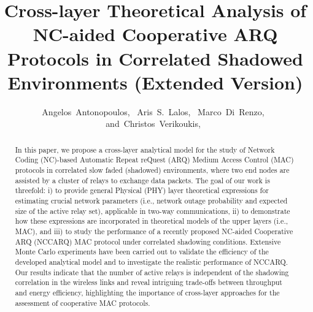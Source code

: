 \documentclass[12pt,draftcls, onecolumn]{IEEEtran}
\begin{document}
\title{Cross-layer Theoretical Analysis of NC-aided Cooperative ARQ Protocols in Correlated Shadowed Environments (Extended Version)}



\author{Angelos~Antonopoulos,~ Aris~S.~Lalos,~
 Marco~Di~Renzo,~ and~Christos~Verikoukis,~
}


\maketitle              



\begin{abstract}
In this paper, we propose a cross-layer analytical model for the study of Network Coding (NC)-based Automatic Repeat reQuest (ARQ) Medium Access Control (MAC) protocols in correlated slow faded (shadowed) environments, where two end nodes are assisted by a cluster of relays to exchange data packets. The goal of our work is threefold: i) to provide general Physical (PHY) layer theoretical expressions for estimating crucial network parameters (i.e., network outage probability and expected size of the active relay set), applicable in two-way communications, ii) to demonstrate how these expressions are incorporated in theoretical models of the upper layers (i.e., MAC), and iii) to study the performance of a recently proposed NC-aided Cooperative ARQ (NCCARQ) MAC protocol under correlated shadowing conditions. Extensive Monte Carlo experiments have been carried out to validate the efficiency of the developed analytical model and to investigate the realistic performance of NCCARQ. Our results indicate that the number of active relays is independent of the shadowing correlation in the wireless links and reveal intriguing trade-offs between throughput and energy efficiency, highlighting the importance of cross-layer approaches for the assessment of cooperative MAC protocols.
\end{abstract}
\end{document}
